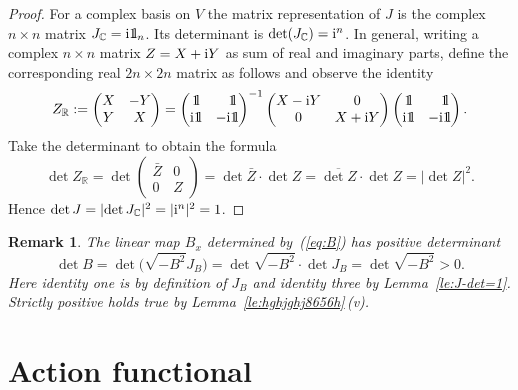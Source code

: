 \documentclass[pdftex]{sigma}
\numberwithin{equation}{section}
\newtheorem{Remark}[Theorem]{Remark}
\newcommand{\C}{{\mathbb{C}}}
\newcommand{\R}{{\mathbb{R}}}
\def\abs#1{\mathopen|#1\mathclose|}
\newcommand{\1}{{{\mathchoice {\rm 1\mskip-4mu l} {\rm 1\mskip-4mu l}
{\rm 1\mskip-4.5mu l} {\rm 1\mskip-5mu l}}}}
\begin{document}
\begin{proof}
For a complex basis on $V$
the matrix representation of $J$ is the complex
$n\times n$ matrix $J_\C={\rm i}\1_n$.
Its determinant is $\det (J_\C)={\rm i}^n$.
In general, writing a complex $n\times n$ matrix $Z=X+{\rm i}Y$
as sum of real and imaginary parts, define the corresponding real
$2n\times 2n$ matrix as follows and observe the identity
\[
 Z_\R:=\begin{pmatrix}X&-Y\\Y&X\end{pmatrix}
 =\begin{pmatrix}\1&\hphantom{-}\1\\ {\rm i}\1&-{\rm i}\1\end{pmatrix}^{-1}
 \begin{pmatrix}X-{\rm i}Y&0\\0&X+{\rm i}Y\end{pmatrix}
 \begin{pmatrix}\1&\hphantom{-}\1\\ {\rm i}\1&-{\rm i}\1\end{pmatrix}.
\]
Take the determinant to obtain the formula
\[
 \det Z_\R
 =\det \begin{pmatrix}\bar Z&0\\0&Z\end{pmatrix}
 =\det\bar Z\cdot \det Z
 =\overline{\det Z}\cdot \det Z
 =\abs{\det Z}^2 .
\]
Hence $\det J=\abs{\det J_\C}^2=\abs{{\rm i}^n}^2=1$.
\end{proof}

\begin{Remark}\label{rem:B+}
The linear map $B_x$ determined by~(\ref{eq:B})
has positive determinant
\begin{equation}\label{eq:B+}
 \det B
 =\det\bigl(\sqrt{-B^2} J_B\bigr)
 =\det\sqrt{-B^2} \cdot\det J_B
 =\det\sqrt{-B^2}
 > 0 .
\end{equation}
Here identity one is by definition of $J_B$ and identity three by
Lemma~\ref{le:J-det=1}.
Strictly positive holds true by
Lemma~\ref{le:hghjghj8656h}\,(v).
\end{Remark}




\section{Action functional}
\label{sec:unp-action}
\end{document}
